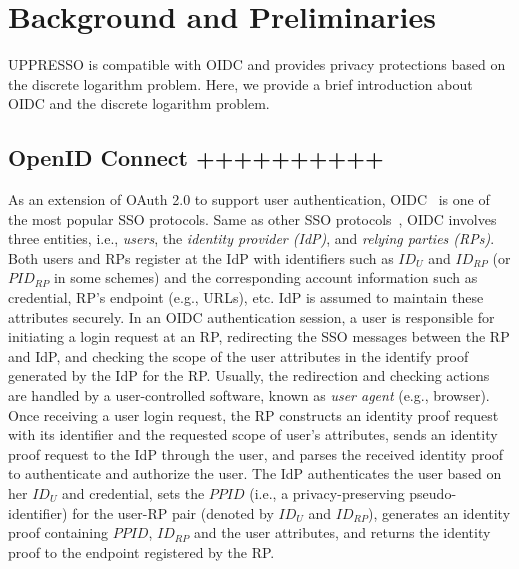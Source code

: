 \section{Background and Preliminaries}
\label{sec:background}
UPPRESSO is compatible with OIDC and provides privacy protections based on the discrete logarithm problem.
Here, we provide a brief introduction about OIDC and the discrete logarithm problem.

\subsection{OpenID Connect ++++++++++}
\label{subsec:OIDC}
As an extension of OAuth 2.0 to support user authentication, OIDC~\cite{OpenIDConnect} is one of the most popular SSO protocols.
Same as other SSO protocols~\cite{SAMLIdentifier}, OIDC involves three entities, i.e., {\em users}, the {\em identity provider (IdP)}, and {\em relying parties (RPs)}.
Both users and RPs register at the IdP with identifiers such as $ID_U$ and $ID_{RP}$ (or $PID_{RP}$ in some schemes) and the corresponding account information such as credential, RP's endpoint (e.g., URLs), etc.
IdP is assumed to maintain these attributes securely. In an OIDC authentication session, a user is responsible for initiating a login request at an RP, redirecting the SSO messages between the RP and IdP, and checking the scope of the user attributes in the identify proof generated by the IdP for the RP. Usually, the redirection and checking actions are handled by a user-controlled software, known as {\em user agent} (e.g., browser). Once receiving a user login request, the RP constructs an identity proof request with its identifier and the requested scope of  user's attributes, sends an identity proof request to the IdP through the user, and parses the received identity proof to authenticate and authorize the user. The IdP authenticates the user based on her $ID_U$ and credential, sets the $PPID$ (i.e., a privacy-preserving pseudo-identifier) for the user-RP pair (denoted by $ID_U$ and $ID_{RP}$), generates an identity proof containing $PPID$, $ID_{RP}$ and the user attributes, and returns the identity proof to the endpoint registered by the RP.

